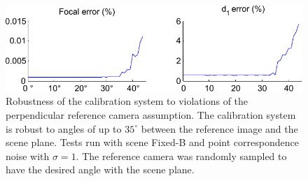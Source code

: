 \documentclass[10pt,twocolumn,letterpaper]{article}
\begin{document}
\begin{figure}
\centering
\includegraphics[width=\linewidth]{images/resultsNormalAngle.pdf}
\caption{Robustness of the calibration system to violations of the perpendicular reference camera assumption. The calibration system is robust to angles of up to $35^\circ$ between the reference image and the scene plane. Tests run with scene Fixed-B and point correspondence noise with $\sigma=1$. The reference camera was randomly sampled to have the desired angle with the scene plane.}
\label{fig:results_normal_angle}
\end{figure}
\end{document}

